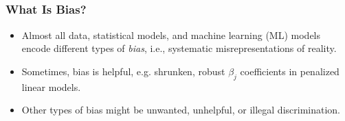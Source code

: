 \documentclass[11pt,
               		aspectratio=169,
               		hyperref={colorlinks}
               		]{beamer}
\begin{document}
		\subsection*{}
		\begin{frame}
			\frametitle{What Is Bias?}			
			\begin{itemize}
			\Large
			\item Almost all data, statistical models, and machine learning (ML) models encode different types of \textit{bias}, i.e., systematic misrepresentations of reality.\\
			\item Sometimes, bias is helpful, e.g. shrunken, robust $\beta_j$ coefficients in penalized linear models.\\
			\item Other types of bias might be unwanted, unhelpful, or illegal discrimination. 
			\end{itemize}
		\end{frame}					
\end{document}
